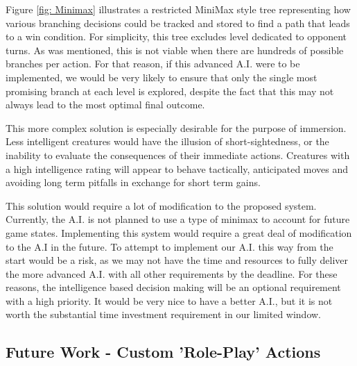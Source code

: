 \documentclass[12pt,a4paper]{report}
\begin{document}
		Figure \ref{fig: Minimax} illustrates a restricted MiniMax style tree representing how various branching decisions could be tracked and stored to find a path that leads to a win condition. For simplicity, this tree excludes level dedicated to opponent turns. As was mentioned, this is not viable when there are hundreds of possible branches per action. For that reason, if this advanced A.I. were to be implemented, we would be very likely to ensure that only the single most promising branch at each level is explored, despite the fact that this may not always lead to the most optimal final outcome. 
		
		This more complex solution is especially desirable for the purpose of immersion. Less intelligent creatures would have the illusion of short-sightedness, or the inability to evaluate the consequences of their immediate actions. Creatures with a high intelligence rating will appear to behave tactically, anticipated moves and avoiding long term pitfalls in exchange for short term gains. 
		
		This solution would require a lot of modification to the proposed system. Currently, the A.I. is not planned to use a type of minimax to account for future game states. Implementing this system would require a great deal of modification to the A.I in the future. To attempt to implement our A.I. this way from the start would be a risk, as we may not have the time and resources to fully deliver the more advanced A.I. with all other requirements by the deadline. For these reasons, the intelligence based decision making will be an optional requirement with a high priority. It would be very nice to have a better A.I., but it is not worth the substantial time investment requirement in our limited window. 
		
		
		\subsection{Future Work - Custom 'Role-Play' Actions}
		
\end{document}
